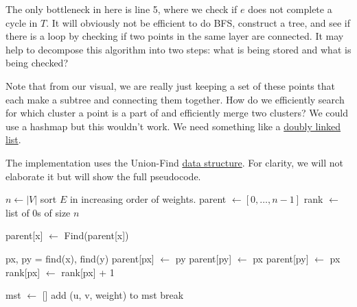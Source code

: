   The only bottleneck in here is line 5, where we check if $e$ does not complete a cycle in $T$. It will obviously not be efficient to do BFS, construct a tree, and see if there is a loop by checking if two points in the same layer are connected. It may help to decompose this algorithm into two steps: what is being stored and what is being checked? 

  Note that from our visual, we are really just keeping a set of these points that each make a subtree and connecting them together. How do we efficiently search for which cluster a point is a part of and efficiently merge two clusters? We could use a hashmap but this wouldn't work. We need something like a \hyperref[def:doubly-linked-list]{doubly linked list}. 

  \begin{algo}
    The implementation uses the Union-Find \hyperref[def:data-structure]{data structure}. For clarity, we will not elaborate it but will show the full pseudocode. 
    \begin{algorithm}[H]
      \label{alg:kruskal}
      \begin{algorithmic}
        \State 
          \State $n \gets |V|$ 
          \State sort $E$ in increasing order of weights. 
          \State parent $\gets [0, \ldots, n-1]$ 
          \State rank $\gets$ list of $0$s of size $n$ 

            \State parent[x] $\gets$ Find(parent[x]) 
            \EndIf
            \State {}
          \EndFunction

            \State px, py = find(x), find(y) 
              \State {}
            \EndIf
              \State parent[px] $\gets$ py
              \State parent[py] $\gets$ px
            \Else{}
              \State parent[py] $\gets$ px 
              \State rank[px] $\gets$ rank[px] + 1
            \EndIf
            \State {}
          \EndFunction

          \State mst $\gets$ [] 
              \State add (u, v, weight) to mst
            \EndIf 
              \State break
            \EndIf 
          \EndFor

          \State {}
        \EndFunction
      \end{algorithmic}
    \end{algorithm}
  \end{algo}
  

